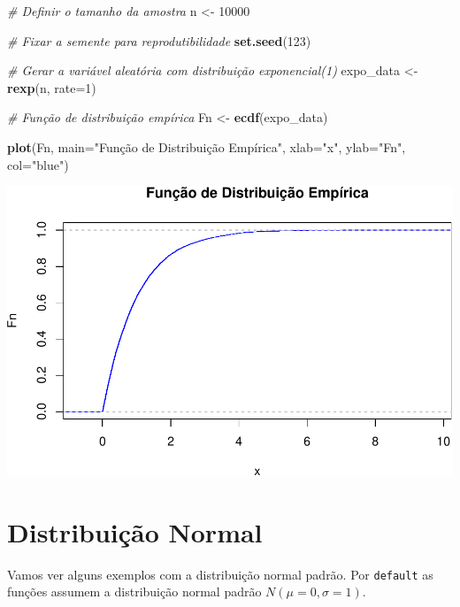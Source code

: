 \documentclass[
]{book}
\newenvironment{Shaded}{\begin{snugshade}}{\end{snugshade}}
\newcommand{\AttributeTok}[1]{\textcolor[rgb]{0.13,0.29,0.53}{#1}}
\newcommand{\CommentTok}[1]{\textcolor[rgb]{0.56,0.35,0.01}{\textit{#1}}}
\newcommand{\DecValTok}[1]{\textcolor[rgb]{0.00,0.00,0.81}{#1}}
\newcommand{\FunctionTok}[1]{\textcolor[rgb]{0.13,0.29,0.53}{\textbf{#1}}}
\newcommand{\NormalTok}[1]{#1}
\newcommand{\OtherTok}[1]{\textcolor[rgb]{0.56,0.35,0.01}{#1}}
\newcommand{\StringTok}[1]{\textcolor[rgb]{0.31,0.60,0.02}{#1}}
\begin{document}
\begin{Shaded}
\begin{Highlighting}[]
\CommentTok{\# Definir o tamanho da amostra}
\NormalTok{n }\OtherTok{\textless{}{-}} \DecValTok{10000}

\CommentTok{\# Fixar a semente para reprodutibilidade}
\FunctionTok{set.seed}\NormalTok{(}\DecValTok{123}\NormalTok{)}

\CommentTok{\# Gerar a variável aleatória com distribuição exponencial(1)}
\NormalTok{expo\_data }\OtherTok{\textless{}{-}} \FunctionTok{rexp}\NormalTok{(n, }\AttributeTok{rate=}\DecValTok{1}\NormalTok{)}

\CommentTok{\# Função de distribuição empírica}
\NormalTok{Fn }\OtherTok{\textless{}{-}} \FunctionTok{ecdf}\NormalTok{(expo\_data)}

\FunctionTok{plot}\NormalTok{(Fn, }\AttributeTok{main=}\StringTok{"Função de Distribuição Empírica"}\NormalTok{,}
     \AttributeTok{xlab=}\StringTok{"x"}\NormalTok{,}
     \AttributeTok{ylab=}\StringTok{"Fn"}\NormalTok{,}
     \AttributeTok{col=}\StringTok{"blue"}\NormalTok{)}
\end{Highlighting}
\end{Shaded}

\includegraphics{introR_files/figure-latex/unnamed-chunk-278-1.pdf}

\section{Distribuição Normal}\label{distribuiuxe7uxe3o-normal}

Vamos ver alguns exemplos com a distribuição normal padrão. Por \texttt{default} as funções assumem a distribuição normal padrão \(N(\mu=0, \sigma = 1)\).
\end{document}
